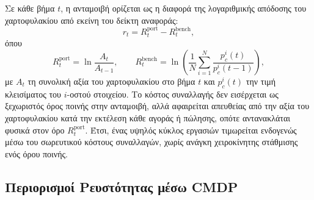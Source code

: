 Σε κάθε βήμα $t$, η ανταμοιβή ορίζεται ως η διαφορά της λογαριθμικής απόδοσης
του χαρτοφυλακίου από εκείνη του δείκτη αναφοράς:
\begin{equation}
  r_t = R^{\mathrm{port}}_t - R^{\mathrm{bench}}_t,
  \label{eq:reward}
\end{equation}
όπου
\begin{equation}
  R^{\mathrm{port}}_t = \ln\frac{A_t}{A_{t-1}},
  \qquad
  R^{\mathrm{bench}}_t = \ln\!\left(\frac{1}{N}\sum_{i=1}^{N}\frac{p^{i}_c(t)}{p^{i}_c(t-1)}\right),
  \label{eq:returns}
\end{equation}
με $A_t$ τη συνολική αξία του χαρτοφυλακίου στο βήμα $t$ και $p^{i}_c(t)$ την
τιμή κλεισίματος του $i$-οστού στοιχείου. Το κόστος συναλλαγής δεν εισέρχεται
ως ξεχωριστός όρος ποινής στην ανταμοιβή, αλλά αφαιρείται απευθείας από την
αξία του χαρτοφυλακίου κατά την εκτέλεση κάθε αγοράς ή πώλησης, οπότε
αντανακλάται φυσικά στον όρο $R^{\mathrm{port}}_t$. Έτσι, ένας υψηλός κύκλος
εργασιών τιμωρείται ενδογενώς μέσω του σωρευτικού κόστους συναλλαγών, χωρίς
ανάγκη χειροκίνητης στάθμισης ενός όρου ποινής.

\subsection{Περιορισμοί Ρευστότητας μέσω CMDP}
\label{sec:cmdp}

